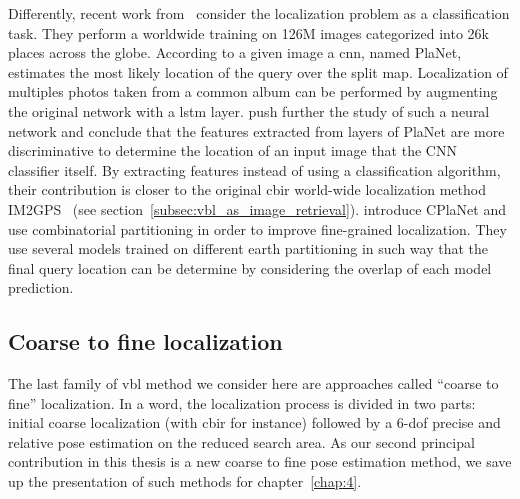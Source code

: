 Differently, recent work from~\citet{Weyand2016} consider the localization problem as a classification task. They perform a worldwide training on 126M images categorized into 26k places across the globe. According to a given image a \ac{cnn}, named PlaNet, estimates the most likely location of the query over the split map. Localization of multiples photos taken from a common album can be performed by augmenting the original network with a \ac{lstm} layer. \citet{Vo2017} push further the study of such a neural network and conclude that the features extracted from layers of PlaNet are more discriminative to determine the location of an input image that the CNN classifier itself. By extracting features instead of using a classification algorithm, their contribution is closer to the original \ac{cbir} world-wide localization method IM2GPS~\citep{Hays2008} (see section~\ref{subsec:vbl_as_image_retrieval}). \citet{Seo2018} introduce CPlaNet and use combinatorial partitioning in order to improve fine-grained localization. They use several models trained on different earth partitioning in such way that the final query location can be determine by considering the overlap of each model prediction.

\subsection{Coarse to fine localization}

The last family of \ac{vbl} method we consider here are approaches called ``coarse to fine'' localization. In a word, the localization process is divided in two parts: initial coarse localization (with \ac{cbir} for instance) followed by a 6-\ac{dof} precise and relative pose estimation on the reduced search area. As our second principal contribution in this thesis is a new coarse to fine pose estimation method, we save up the presentation of such methods for chapter~\ref{chap:4}.

